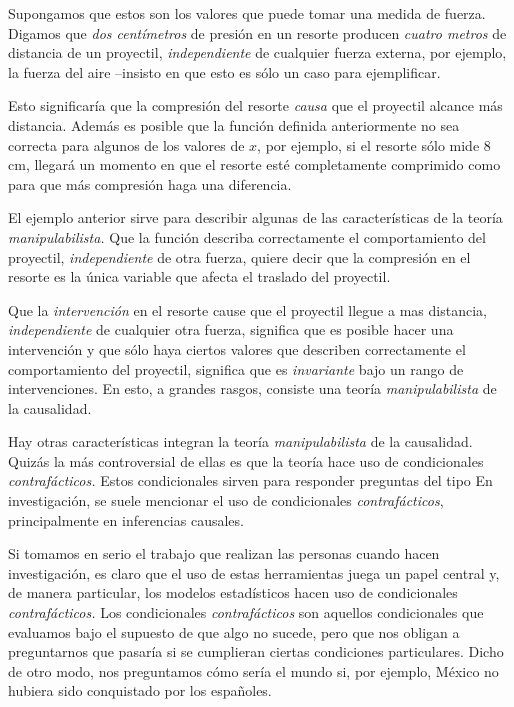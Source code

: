 Supongamos que estos son los valores que puede tomar una medida de fuerza.
Digamos que \emph{dos centímetros} de presión en un resorte producen \emph{cuatro metros} de distancia de un proyectil, \emph{independiente} de cualquier fuerza externa, por ejemplo, la fuerza del aire --insisto en que esto es sólo un caso para ejemplificar. 

Esto significaría que la compresión del resorte \emph{causa} que el proyectil alcance más distancia. 
Además es posible que la función definida anteriormente no sea correcta para algunos de los valores de $x$, por ejemplo, si el resorte sólo mide $8$ cm, llegará un momento en que el resorte esté completamente comprimido como para que más compresión haga una diferencia.

El ejemplo anterior sirve para describir algunas de las características de la teoría \emph{manipulabilista.} 
Que la función describa correctamente el comportamiento del proyectil, \emph{independiente} de otra fuerza, quiere decir que la compresión en el resorte es la única variable que afecta el traslado del proyectil. 

Que la \emph{intervención} en el resorte cause que el proyectil llegue a mas distancia, \emph{independiente} de cualquier otra fuerza, significa que es posible hacer una intervención  y que sólo haya ciertos valores que describen correctamente el comportamiento del proyectil, significa que es \emph{invariante} bajo un rango de intervenciones. 
En esto, a grandes rasgos, consiste una teoría \emph{manipulabilista} de la causalidad.

Hay otras características integran la teoría \emph{manipulabilista} de la causalidad.
Quizás la más controversial de ellas es que la teoría hace uso de condicionales \emph{contrafácticos.} 
Estos condicionales sirven para responder preguntas del tipo 
En investigación, se suele mencionar el uso de condicionales \emph{contrafácticos}, principalmente en inferencias causales. 

Si tomamos en serio el trabajo que realizan las personas cuando hacen investigación, es claro que el uso de estas herramientas juega un papel central y, de manera particular, los modelos estadísticos hacen uso de condicionales \emph{contrafácticos.} 
Los condicionales \emph{contrafácticos} son aquellos condicionales que evaluamos bajo el supuesto de que algo no sucede, pero que nos obligan a preguntarnos que pasaría si se cumplieran ciertas condiciones particulares. 
Dicho de otro modo, nos preguntamos cómo sería el mundo si, por ejemplo, México no hubiera sido conquistado por los españoles. 

